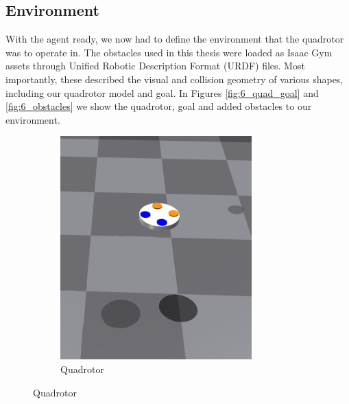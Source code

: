 \subsection{Environment}
With the agent ready, we now had to define the environment that the quadrotor was to operate in. The obstacles used in this thesis were loaded as Isaac Gym assets through Unified Robotic Description Format (URDF) files. Most importantly, these described the visual and collision geometry of various shapes, including our quadrotor model and goal. 
In Figures \ref{fig:6_quad_goal} and \ref{fig:6_obstacles} we show the quadrotor, goal and added obstacles to our environment.
\begin{figure}[H]
     \centering
     \hspace{0.04\textwidth}
     \begin{subfigure}[b]{0.3\textwidth}
         \centering
         \captionsetup{justification=centering}
         \includegraphics[width=\textwidth]{figures/6_/6_quadrotor.png}
         \caption{Quadrotor}
         \label{fig:6_quadrotor}
     \end{subfigure} 
     \hspace{0.15\textwidth}

\end{figure}
